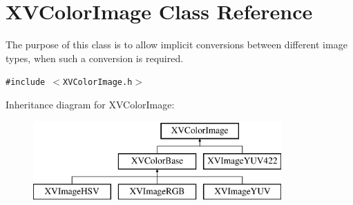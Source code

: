 \hypertarget{class_XVColorImage}{
\section{XVColor\-Image  Class Reference}
\label{XVColorImage}
}
The purpose of this class is to allow implicit conversions between different image types, when such a conversion is required. 


{\tt \#include $<$XVColor\-Image.h$>$}

Inheritance diagram for XVColor\-Image:\begin{figure}[H]
\begin{center}
\leavevmode
\includegraphics[height=3cm]{class_XVColorImage}
\end{center}
\end{figure}

